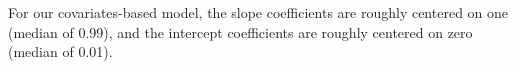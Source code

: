For our covariates-based model, the slope coefficients are roughly centered on one (median of 0.99), and the intercept coefficients are roughly centered on zero (median of 0.01).